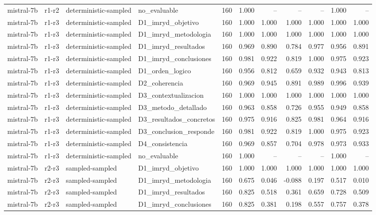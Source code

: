 \begin{table}
\begin{tabular}{llllrrrrrrr}
mistral-7b & r1-r2 & deterministic-sampled & no\_evaluable & 160 & 1.000 & -- & -- & -- & 1.000 & -- \\
mistral-7b & r1-r3 & deterministic-sampled & D1\_imryd\_objetivo & 160 & 1.000 & 1.000 & 1.000 & 1.000 & 1.000 & 1.000 \\
mistral-7b & r1-r3 & deterministic-sampled & D1\_imryd\_metodologia & 160 & 1.000 & 1.000 & 1.000 & 1.000 & 1.000 & 1.000 \\
mistral-7b & r1-r3 & deterministic-sampled & D1\_imryd\_resultados & 160 & 0.969 & 0.890 & 0.784 & 0.977 & 0.956 & 0.891 \\
mistral-7b & r1-r3 & deterministic-sampled & D1\_imryd\_conclusiones & 160 & 0.981 & 0.922 & 0.819 & 1.000 & 0.975 & 0.923 \\
mistral-7b & r1-r3 & deterministic-sampled & D1\_orden\_logico & 160 & 0.956 & 0.812 & 0.659 & 0.932 & 0.943 & 0.813 \\
mistral-7b & r1-r3 & deterministic-sampled & D2\_coherencia & 160 & 0.969 & 0.945 & 0.891 & 0.989 & 0.996 & 0.939 \\
mistral-7b & r1-r3 & deterministic-sampled & D3\_contextualizacion & 160 & 1.000 & 1.000 & 1.000 & 1.000 & 1.000 & 1.000 \\
mistral-7b & r1-r3 & deterministic-sampled & D3\_metodo\_detallado & 160 & 0.963 & 0.858 & 0.726 & 0.955 & 0.949 & 0.858 \\
mistral-7b & r1-r3 & deterministic-sampled & D3\_resultados\_concretos & 160 & 0.975 & 0.916 & 0.825 & 0.981 & 0.964 & 0.916 \\
mistral-7b & r1-r3 & deterministic-sampled & D3\_conclusion\_responde & 160 & 0.981 & 0.922 & 0.819 & 1.000 & 0.975 & 0.923 \\
mistral-7b & r1-r3 & deterministic-sampled & D4\_consistencia & 160 & 0.969 & 0.857 & 0.704 & 0.978 & 0.973 & 0.933 \\
mistral-7b & r1-r3 & deterministic-sampled & no\_evaluable & 160 & 1.000 & -- & -- & -- & 1.000 & -- \\
mistral-7b & r2-r3 & sampled-sampled & D1\_imryd\_objetivo & 160 & 1.000 & 1.000 & 1.000 & 1.000 & 1.000 & 1.000 \\
mistral-7b & r2-r3 & sampled-sampled & D1\_imryd\_metodologia & 160 & 0.675 & 0.046 & -0.088 & 0.197 & 0.517 & 0.010 \\
mistral-7b & r2-r3 & sampled-sampled & D1\_imryd\_resultados & 160 & 0.825 & 0.518 & 0.361 & 0.659 & 0.728 & 0.509 \\
mistral-7b & r2-r3 & sampled-sampled & D1\_imryd\_conclusiones & 160 & 0.825 & 0.381 & 0.198 & 0.557 & 0.757 & 0.378 \\

\end{tabular}
\end{table}
